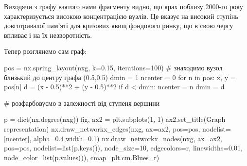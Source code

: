 \documentclass[
  letterpaper,
]{report}
\newenvironment{Shaded}{\begin{snugshade}}{\end{snugshade}}
\newcommand{\BuiltInTok}[1]{\textcolor[rgb]{0.00,0.23,0.31}{#1}}
\newcommand{\CommentTok}[1]{\textcolor[rgb]{0.37,0.37,0.37}{#1}}
\newcommand{\ControlFlowTok}[1]{\textcolor[rgb]{0.00,0.23,0.31}{#1}}
\newcommand{\DecValTok}[1]{\textcolor[rgb]{0.68,0.00,0.00}{#1}}
\newcommand{\FloatTok}[1]{\textcolor[rgb]{0.68,0.00,0.00}{#1}}
\newcommand{\KeywordTok}[1]{\textcolor[rgb]{0.00,0.23,0.31}{#1}}
\newcommand{\NormalTok}[1]{\textcolor[rgb]{0.00,0.23,0.31}{#1}}
\newcommand{\OperatorTok}[1]{\textcolor[rgb]{0.37,0.37,0.37}{#1}}
\newcommand{\StringTok}[1]{\textcolor[rgb]{0.13,0.47,0.30}{#1}}
\begin{document}
Виходячи з графу взятого нами фрагменту видно, що крах поблизу 2000-го
року характеризується високою концентрацією вузлів. Це вказує на високий
ступінь довготривалої пам'яті для кризових явищ фондового ринку, що в
свою чергу впливає і на їх незворотність.

Тепер розглянемо сам граф:

\begin{Shaded}
\begin{Highlighting}[]
\NormalTok{pos }\OperatorTok{=}\NormalTok{ nx.spring\_layout(nxg, k}\OperatorTok{=}\FloatTok{0.15}\NormalTok{, iterations}\OperatorTok{=}\DecValTok{100}\NormalTok{)}
\CommentTok{\# знаходимо вузол близький до центру графа (0.5,0.5)}
\NormalTok{dmin }\OperatorTok{=} \DecValTok{1}
\NormalTok{ncenter }\OperatorTok{=} \DecValTok{0}
\ControlFlowTok{for}\NormalTok{ n }\KeywordTok{in}\NormalTok{ pos: }
\NormalTok{    x, y }\OperatorTok{=}\NormalTok{ pos[n]}
\NormalTok{    d }\OperatorTok{=}\NormalTok{ (x }\OperatorTok{{-}} \FloatTok{0.5}\NormalTok{)}\OperatorTok{**}\DecValTok{2} \OperatorTok{+}\NormalTok{ (y }\OperatorTok{{-}} \FloatTok{0.5}\NormalTok{)}\OperatorTok{**}\DecValTok{2}
    \ControlFlowTok{if}\NormalTok{ d }\OperatorTok{\textless{}}\NormalTok{ dmin:}
\NormalTok{        ncenter }\OperatorTok{=}\NormalTok{ n}
\NormalTok{        dmin }\OperatorTok{=}\NormalTok{ d}

\CommentTok{\# розфарбовуємо в залежності від ступеня вершини}

\NormalTok{p }\OperatorTok{=} \BuiltInTok{dict}\NormalTok{(nx.degree(nxg))}
\NormalTok{fig, ax2 }\OperatorTok{=}\NormalTok{ plt.subplots(}\DecValTok{1}\NormalTok{, }\DecValTok{1}\NormalTok{)}
\NormalTok{ax2.set\_title(}\StringTok{\textquotesingle{}Graph representation\textquotesingle{}}\NormalTok{)}
\NormalTok{nx.draw\_networkx\_edges(nxg, ax}\OperatorTok{=}\NormalTok{ax2, pos}\OperatorTok{=}\NormalTok{pos, nodelist}\OperatorTok{=}\NormalTok{[ncenter], alpha}\OperatorTok{=}\FloatTok{0.4}\NormalTok{,width}\OperatorTok{=}\FloatTok{0.1}\NormalTok{)}
\NormalTok{nx.draw\_networkx\_nodes(nxg, ax}\OperatorTok{=}\NormalTok{ax2, pos}\OperatorTok{=}\NormalTok{pos, nodelist}\OperatorTok{=}\BuiltInTok{list}\NormalTok{(p.keys()),}
\NormalTok{                       node\_size}\OperatorTok{=}\DecValTok{10}\NormalTok{, edgecolors}\OperatorTok{=}\StringTok{\textquotesingle{}r\textquotesingle{}}\NormalTok{, linewidths}\OperatorTok{=}\FloatTok{0.01}\NormalTok{,}
\NormalTok{                       node\_color}\OperatorTok{=}\BuiltInTok{list}\NormalTok{(p.values()),}
\NormalTok{                       cmap}\OperatorTok{=}\NormalTok{plt.cm.Blues\_r)}
        

\end{Highlighting}
\end{Shaded}
\end{document}
